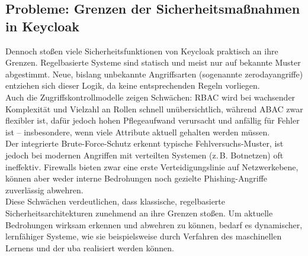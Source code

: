 \documentclass[a4paper,12pt]{article}
\begin{document}
	\subsection{Probleme: Grenzen der Sicherheitsmaßnahmen in Keycloak}
	Dennoch stoßen viele Sicherheitsfunktionen von Keycloak praktisch an ihre Grenzen. Regelbasierte Systeme sind statisch und meist nur auf bekannte Muster abgestimmt. Neue, bislang unbekannte Angriffsarten (sogenannte \gls{zerodayangriff}e) entziehen sich dieser Logik, da keine entsprechenden Regeln vorliegen.
	\\[0.5em]
	Auch die Zugriffskontrollmodelle zeigen Schwächen: RBAC wird bei wachsender Komplexität und Vielzahl an Rollen schnell unübersichtlich, während ABAC zwar flexibler ist, dafür jedoch hohen Pflegeaufwand verursacht und anfällig für Fehler ist – insbesondere, wenn viele Attribute aktuell gehalten werden müssen.
	\\[0.5em]
	Der integrierte Brute-Force-Schutz erkennt typische Fehlversuchs-Muster, ist jedoch bei modernen Angriffen mit verteilten Systemen (z.\,B. Botnetzen) oft ineffektiv. Firewalls bieten zwar eine erste Verteidigungslinie auf Netzwerkebene, können aber weder interne Bedrohungen noch gezielte Phishing-Angriffe zuverlässig abwehren.
	\\[0.5em]
	Diese Schwächen verdeutlichen, dass klassische, regelbasierte Sicherheitsarchitekturen zunehmend an ihre Grenzen stoßen. Um aktuelle Bedrohungen wirksam erkennen und abwehren zu können, bedarf es dynamischer, lernfähiger Systeme, wie sie beispielsweise durch Verfahren des maschinellen Lernens und der \gls{uba} realisiert werden können.
	
\end{document}
